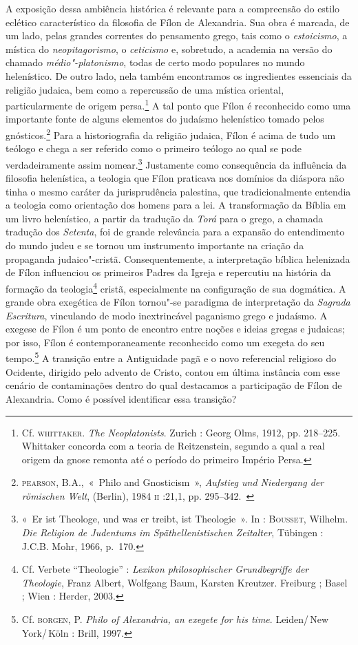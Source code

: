 A exposição dessa ambiência histórica é relevante para a
compreensão do estilo eclético característico da filosofia de
Fílon de Alexandria. Sua obra é marcada, de um lado, pelas
grandes correntes do pensamento grego, tais como o
\emph{estoicismo}, a mística do \emph{neopitagorismo}, o
\emph{ceticismo} e, sobretudo, a academia na versão do chamado
\emph{médio"-platonismo}, todas de certo modo populares no
mundo helenístico. De outro lado, nela também encontramos os
ingredientes essenciais da religião judaica, bem como a
repercussão de uma mística oriental, particularmente de origem
persa.\footnote{ Cf. \textsc{whittaker}. \emph{The
Neoplatonists}. Zurich : Georg Olms, 1912, pp. 218--225.
Whittaker concorda com a teoria de Reitzenstein, segundo a qual
a real origem da gnose remonta até o período do primeiro Império
Persa.} A tal ponto que Fílon é reconhecido como uma importante
fonte de alguns elementos do judaísmo helenístico tomado pelos
gnósticos.\footnote{ \textsc{pearson}, B.A.,~«~Philo and
Gnosticism~», \emph{Aufstieg und Niedergang der römischen
Welt}, (Berlin), 1984 \textsc{ii} :21,1, pp. 295--342.~} Para a
historiografia da religião judaica, Fílon é acima de tudo um
teólogo e chega a ser referido como o primeiro teólogo ao qual
se pode verdadeiramente assim nomear.\footnote{ «~Er ist
Theologe, und was er treibt, ist Theologie~». In :
\textsc{Bousset}, Wilhelm. \emph{Die Religion de
Judentums im Späthellenistischen Zeitalter}, Tübingen : J.C.B.
Mohr, 1966, p.~170.} Justamente como consequência da influência
da filosofia helenística, a teologia que Fílon praticava nos
domínios da diáspora não tinha o mesmo caráter da jurisprudência
palestina, que tradicionalmente entendia a teologia como
orientação dos homens para a lei. A transformação da Bíblia em
um livro helenístico, a partir da tradução da \emph{Torá} para
o grego, a chamada tradução dos \emph{Setenta}, foi de grande
relevância para a expansão do entendimento do mundo judeu e se
tornou um instrumento importante na criação da propaganda
judaico"-cristã. Consequentemente, a interpretação bíblica
helenizada de Fílon influenciou os primeiros Padres da Igreja e
repercutiu na história da formação da
teologia\footnote{ Cf. Verbete
``Theologie'' : \emph{Lexikon philosophischer Grundbegriffe der
Theologie}, Franz Albert, Wolfgang Baum, Karsten Kreutzer.
Freiburg ; Basel ; Wien : Herder, 2003.} cristã, especialmente
na configuração de sua
dogmática. A grande obra exegética de
Fílon tornou"-se paradigma de interpretação da \emph{Sagrada
Escritura}, vinculando de modo inextrincável  paganismo grego e
judaísmo. A exegese de Fílon é um ponto de encontro entre noções
e ideias gregas e judaicas; por isso, Fílon é contemporaneamente
reconhecido como um exegeta do seu
tempo.\footnote{ Cf. \textsc{borgen},
P. \emph{Philo of Alexandria, an exegete for his time}.
Leiden/\,New York/\,Köln : Brill, 1997.} A transição entre a
Antiguidade pagã e o novo referencial religioso do Ocidente,
dirigido pelo advento de Cristo, contou em última instância com
esse cenário de contaminações dentro do qual destacamos a
participação de Fílon de Alexandria. Como é possível identificar
essa transição?


